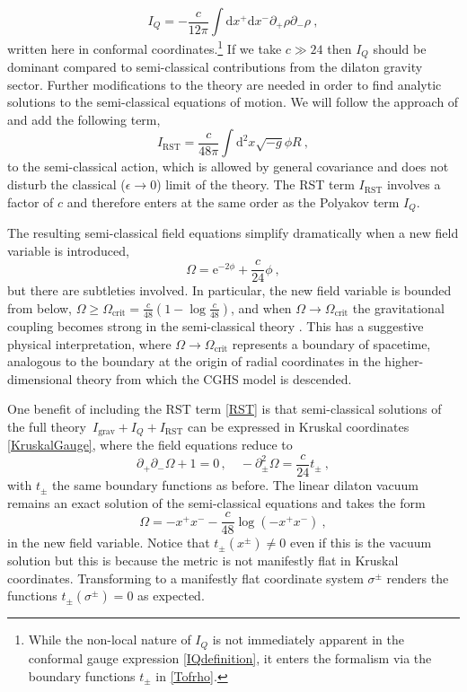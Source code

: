 \documentclass[12pt,a4paper]{article}
\newcommand{\dd}{\mathrm{d}}
\newcommand{\e}{\mathrm{e}}
\newcommand{\be}{\begin{equation}}
\newcommand{\ee}{\end{equation}}
\newcommand{\f}[2]{\frac{#1}{#2}}
\begin{document}
\be\label{IQdefinition}
I_Q =-\f{c}{12\pi} \int \dd x^+\dd x^- \partial_+\rho\partial_-\rho~,
\ee
written here in conformal coordinates.\footnote{While the non-local nature of $I_Q$ is not immediately apparent in the conformal gauge expression \eqref{IQdefinition}, it enters the formalism via the boundary functions $t_\pm$ in \eqref{Tofrho}.}
If we take $c\gg 24$ then $I_{Q}$ should be dominant compared to semi-classical contributions from the dilaton gravity sector. 
Further modifications to the theory are needed in order to find analytic solutions to the semi-classical equations of motion. We will follow the approach of \cite{Russo:1992ax} and add the following term,
\be\label{RST}
I_\text{RST} = \f{c}{48\pi }\int \dd^2 x \sqrt{-g} \phi R~,
\ee
to the semi-classical action, which is allowed by general covariance and does not disturb the classical ($\epsilon\rightarrow 0$) limit of the theory. The RST term $I_\text{RST}$ involves a factor of $c$ and therefore enters at the same order as the Polyakov term $I_{Q}$.

The resulting semi-classical field equations simplify dramatically when a new field variable is introduced,
\be\label{Omegaphirel}
\Omega = \e^{-2\phi} + \f{c}{24} \phi~,
\ee
but there are subtleties involved. In particular, the new field variable is bounded from below, $\Omega\ge \Omega_\text{crit}=\frac{c}{48} \left(1-\log \frac{c}{48}\right)$,
and when $\Omega\rightarrow \Omega_\text{crit}$ the gravitational coupling becomes strong in the semi-classical theory \cite{Russo:1992ax}. This has a suggestive physical interpretation, where $\Omega\rightarrow \Omega_\text{crit}$ represents a boundary of spacetime, analogous to the boundary at the origin of radial coordinates in the higher-dimensional theory from which the CGHS model is descended. 

One benefit of including the RST term \eqref{RST} is that semi-classical solutions of the full theory~$I_\text{grav}+I_Q+I_\text{RST}$ can be expressed in Kruskal coordinates \eqref{KruskalGauge}, where the field equations reduce to
\be\label{RSTEOM}
\partial_+\partial_- \Omega +1= 0\,,\quad - \partial_\pm^2  \Omega=\f{c}{24} t_\pm~,
\ee
with $t_\pm$ the same boundary functions as before.
The linear dilaton vacuum remains an exact solution of the semi-classical equations and takes the form
\be\label{RSTvacuum}
\Omega=-x^+ x^- - \f{c}{48}\log(-x^+x^-)~,
\ee
in the new field variable.
Notice that $t_\pm (x^\pm)\ne0$ even if this is the vacuum solution but this is because the metric is not manifestly flat in Kruskal coordinates. Transforming to a manifestly flat coordinate system $\sigma^\pm$ renders the functions $t_\pm(\sigma^\pm) =0$ as expected.
\end{document}
